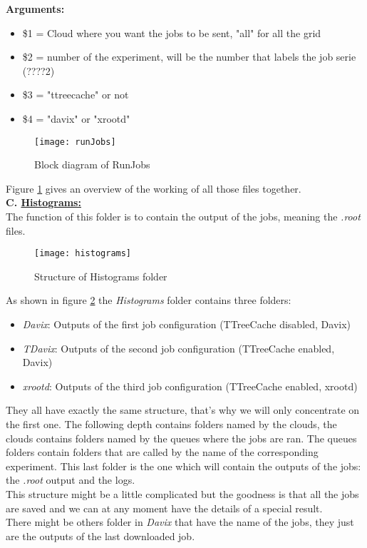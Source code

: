 \textbf{Arguments:}\\
\begin{itemize}
	\item \$1 = Cloud where you want the jobs to be sent, "all" for all the grid
	\item \$2 = number of the experiment, will be the number that labels the job serie (????2)
	\item \$3 = "ttreecache" or not
	\item \$4 = "davix" or "xrootd"
\end{itemize}

\begin{figure}
	\center
	\texttt{[image: runJobs]}
	\caption{Block diagram of RunJobs}
	\label{fig:runJobs}
\end{figure}

Figure \ref{fig:runJobs} gives an overview of the working of all those files together.\\

\indent \textbf{C. \underline{Histograms:}}\\

The function of this folder is to contain the output of the jobs, meaning the \textit{.root} files.

\begin{figure}
	\center
	\texttt{[image: histograms]}
	\caption{Structure of Histograms folder}
	\label{fig:histograms}
\end{figure}

As shown in figure \ref{fig:histograms} the \textit{Histograms} folder contains three folders:

\begin{itemize}
	\item \textit{Davix}: Outputs of the first job configuration (TTreeCache disabled, Davix)
	\item \textit{TDavix}: Outputs of the second job configuration (TTreeCache enabled, Davix)
	\item \textit{xrootd}: Outputs of the third job configuration (TTreeCache enabled, xrootd)
\end{itemize}

They all have exactly the same structure, that's why we will only concentrate on the first one. The following depth contains folders named by the clouds, the clouds contains folders named by the queues where the jobs are ran. The queues folders contain folders that are called by the name of the corresponding experiment. This last folder is the one which will contain the outputs of the jobs: the \textit{.root} output and the logs.\\
This structure might be a little complicated but the goodness is that all the jobs are saved and we can at any moment have the details of a special result.\\
There might be others folder in \textit{Davix} that have the name of the jobs, they just are the outputs of the last downloaded job. \\

